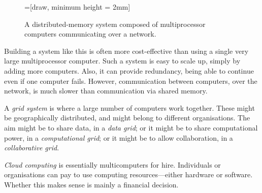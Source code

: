 \begin{figure}
\begin{center}
=[draw, minimum height = 2mm]
\end{center}
\caption{A distributed-memory system composed of multiprocessor computers
  communicating over a network.}
\label{fig:distributed}
\end{figure}


Building a system like this is often more cost-effective than using a single
very large multiprocessor computer.  Such a system is easy to scale up, simply
by adding more computers.  Also, it can provide redundancy, being able to
continue even if one computer fails.  However, communication between
computers, over the network, is much slower than communication via shared
memory.

A \emph{grid system} is where a large number of computers work together.
These might be geographically distributed, and might belong to different
organisations.  The aim might be to share data, in a \emph{data grid}; or it
might be to share computational power, in a \emph{computational grid}; or it
might be to allow collaboration, in a \emph{collaborative grid}. 

\emph{Cloud computing} is essentially multicomputers for hire.  Individuals or
organisations can pay to use computing resources---either hardware or
software.  Whether this makes sense is mainly a financial decision.

